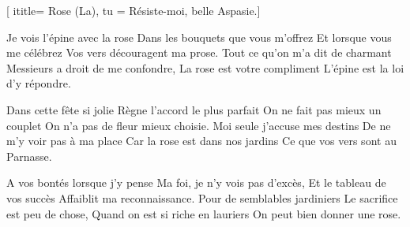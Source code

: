  [
ititle= {Rose (La)},
tu = {Résiste-moi, belle Aspasie.}]


\beginverse
Je vois l'épine avec la rose
Dans les bouquets que vous m'offrez
Et lorsque vous me célébrez
Vos vers découragent ma prose.
Tout ce qu'on m'a dit de charmant
Messieurs a droit de me confondre,
La rose est votre compliment
L'épine est la loi d'y répondre.
\endverse

\beginverse
Dans cette fête si jolie
Règne l'accord le plus parfait
On ne fait pas mieux un couplet
On n'a pas de fleur mieux choisie.
Moi seule j'accuse mes destins
De ne m'y voir pas à ma place
Car la rose est dans nos jardins
Ce que vos vers sont au Parnasse.
\endverse

\beginverse
A vos bontés lorsque j'y pense
Ma foi, je n'y vois pas d'excès,
Et le tableau de vos succès
Affaiblit ma reconnaissance.
Pour de semblables jardiniers
Le sacrifice est peu de chose,
Quand on est si riche en lauriers
On peut bien donner une rose.
\endverse

\endsong